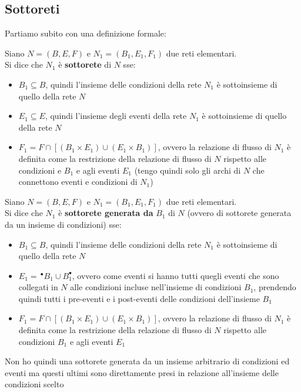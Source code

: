 \documentclass[a4paper,12pt, oneside]{book}
\begin{document}
\subsection{Sottoreti}
Partiamo subito con una definizione formale:
\begin{definizione}
  Siano $N=(B,E,F)$ e $N_1=(B_1,E_1,F_1)$ due reti elementari.\\
  Si dice che $N_1$ è \textbf{sottorete} di $N$ sse:
  \begin{itemize}
    \item $B_1\subseteq B$, quindi l'insieme delle condizioni della rete $N_1$
    è sottoinsieme di quello della rete $N$
    \item $E_1\subseteq E$, quindi l'insieme degli eventi della rete $N_1$
    è sottoinsieme di quello della rete $N$
    \item $F_1=F\cap[(B_1\times E_1)\cup (E_1\times B_1)]$, ovvero la relazione
    di flusso di $N_1$ è definita come la restrizione della relazione di flusso
    di $N$ rispetto alle condizioni e $B_1$ e agli eventi $E_1$ (tengo quindi
    solo gli archi di $N$ che connettono eventi e condizioni di $N_1$)
  \end{itemize}
\end{definizione}
\begin{definizione}
  Siano $N=(B,E,F)$ e $N_1=(B_1,E_1,F_1)$ due reti elementari.\\
  Si dice che $N_1$ è \textbf{sottorete generata da} $B_1$ di $N$ (ovvero di
  sottorete generata da un insieme di condizioni) sse:
  \begin{itemize}
    \item $B_1\subseteq B$, quindi l'insieme delle condizioni della rete $N_1$
    è sottoinsieme di quello della rete $N$
    \item $E_1=\, ^\bullet B_1\cup B_1^\bullet$, ovvero come eventi si
    hanno tutti quegli eventi che sono collegati in $N$ alle condizioni incluse
    nell'insieme di condizioni $B_1$, prendendo quindi tutti i pre-eventi e i
    post-eventi delle condizioni dell'insieme $B_1$
    \item $F_1=F\cap[(B_1\times E_1)\cup (E_1\times B_1)]$, ovvero la relazione
    di flusso di $N_1$ è definita come la restrizione della relazione di flusso
    di $N$ rispetto alle condizioni $B_1$ e agli eventi $E_1$
  \end{itemize}
  Non ho quindi una sottorete generata da un insieme arbitrario di condizioni ed
  eventi ma questi ultimi sono direttamente presi in relazione all'insieme delle
  condizioni scelto
\end{definizione}
\end{document}
